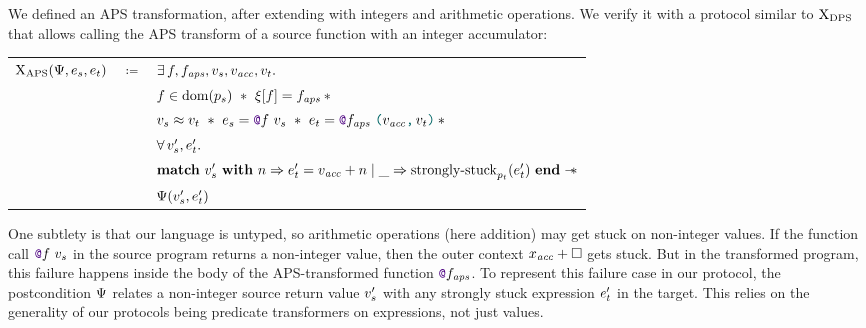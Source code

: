 We defined an APS transformation, after extending \DataLang with integers and arithmetic operations. We verify it with a protocol similar to $\mathrm{X}_\mathrm{DPS}$ that allows calling the APS transform of a source function with an integer accumulator:

\medskip
\begin{tabular}{rcl}
        $\iProt_\mathrm{APS} (\iPredTwo, \datalangExpr_s, \datalangExpr_t)$
        & $\coloneqq$ &
        $\exists \datalangFn, \datalangFn_\mathit{aps}, \datalangVal_s, \datalangVal_\mathit{acc}, \datalangVal_t \ldotp$
    \\
        &&
        $\datalangFn \in \dom{\datalangProg_s}
        \ \iSep\ %
        \datalangRenaming [\datalangFn] = \datalangFn_\mathit{aps}
        \iSep {}$
    \\
        &&
        $\datalangVal_s \iSimilar \datalangVal_t
        \ \iSep\ %
        \datalangExpr_s = \datalangCall{\datalangFnptr{\datalangFn}}{\datalangVal_s}
        \ \iSep\ %
        \datalangExpr_t = \datalangCall{\datalangFnptr{\datalangFn_\mathit{aps}}}{\datalangPair{\datalangVal_\mathit{acc}}{\datalangVal_t}}
        \iSep {}$
    \\
        &&
        $\forall \datalangVal_s', \datalangExpr_t' \ldotp$
    \\
        &&
        $\bm{\mathrm{match}}\ \datalangVal_s'\ \bm{\mathrm{with}}\ \datalangNat \Rightarrow \datalangExpr_t' = \datalangVal_\mathit{acc} + \datalangNat \mid \_ \Rightarrow \mathrm{strongly \mathhyphen stuck}_{\datalangProg_t} (\datalangExpr_t')\ \bm{\mathrm{end}} \iWand$
    \\
        &&
        $\iPredTwo (\datalangVal_s', \datalangExpr_t')$
\end{tabular}
\medskip

One subtlety is that our \DataLang language is untyped, so arithmetic operations (here addition) may get stuck on non-integer values. If the function call $\datalangCall {\datalangFnptr \datalangFn} {\datalangVal_s}$ in the source program returns a non-integer value, then the outer context $\datalangVar_\mathit{acc} + \datalangCtxHole$ gets stuck. But in the transformed program, this failure happens inside the body of the APS-transformed function $\datalangFnptr {\datalangFn_\mathit{aps}}$. To represent this failure case in our protocol, the postcondition $\Psi$ relates a non-integer source return value $\datalangVal_s'$ with any strongly stuck expression $\datalangExpr_t'$ in the target. This relies on the generality of our protocols being predicate transformers on expressions, not just values.